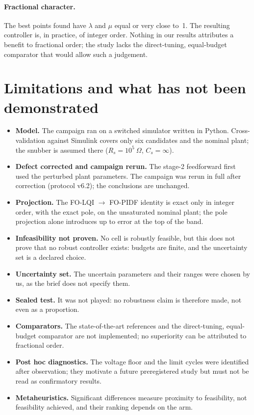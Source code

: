 \paragraph{Fractional character.}
The best points found have $\lambda$ and $\mu$ equal or very close to~1. The
resulting controller is, in practice, of integer order. Nothing in our results
attributes a benefit to fractional order; the study lacks the direct-tuning,
equal-budget comparator that would allow such a judgement.

\section{Limitations and what has not been demonstrated}
\label{sec:limitations}

\begin{itemize}
\item \textbf{Model.} The campaign ran on a switched simulator written in
  Python. Cross-validation against Simulink covers only six candidates and
  the nominal plant; the snubber is assumed there ($R_s=10^5~\Omega$,
  $C_s=\infty$).
\item \textbf{Defect corrected and campaign rerun.} The stage-2
  feedforward first used the perturbed plant parameters. The campaign was
  rerun in full after correction (protocol v6.2); the conclusions are
  unchanged.
\item \textbf{Projection.} The FO-LQI $\to$ FO-PIDF identity is exact only
  in integer order, with the exact pole, on the unsaturated nominal plant; the
  pole projection alone introduces up to \ChiffreErreurProjPole{} error at the
  top of the band.
\item \textbf{Infeasibility not proven.} No cell is robustly feasible, but
  this does not prove that no robust controller exists: budgets are finite,
  and the uncertainty set is a declared choice.
\item \textbf{Uncertainty set.} The uncertain parameters and their ranges
  were chosen by us, as the brief does not specify them.
\item \textbf{Sealed test.} It was not played: no robustness claim is
  therefore made, not even as a proportion.
\item \textbf{Comparators.} The state-of-the-art references and the
  direct-tuning, equal-budget comparator are not implemented; no superiority
  can be attributed to fractional order.
\item \textbf{Post hoc diagnostics.} The voltage floor and the limit cycles
  were identified after observation; they motivate a future preregistered
  study but must not be read as confirmatory results.
\item \textbf{Metaheuristics.} Significant differences measure proximity to
  feasibility, not feasibility achieved, and their ranking depends on the arm.
\end{itemize}
